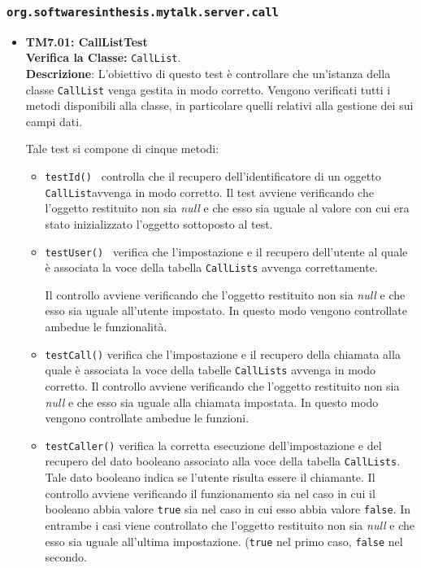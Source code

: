 \subsubsection{\texttt{org.softwaresinthesis.mytalk.server.call}}
\begin{itemize}
\item \textbf{TM7.01: CallListTest}\\
\textbf{Verifica la Classe:} \texttt{CallList}.\\
\textbf{Descrizione}: L'obiettivo di questo test è controllare che un'istanza della classe  \texttt{CallList} venga gestita in modo corretto. Vengono verificati tutti i metodi disponibili alla classe, in particolare quelli relativi alla gestione dei sui campi dati.

Tale test si compone di cinque metodi:
\begin{itemize}
\item \texttt{testId() } controlla che il recupero dell'identificatore di un oggetto \texttt{CallList}avvenga in modo corretto. 
Il test avviene verificando che l'oggetto restituito non sia \textit{null} e che esso sia uguale al valore con cui era stato inizializzato l'oggetto sottoposto al test.

\item \texttt{testUser() } verifica che l'impostazione e il recupero dell'utente al quale è associata la voce della tabella \texttt{CallLists} avvenga correttamente. 

Il controllo avviene verificando che l'oggetto restituito non sia \textit{null} e che esso sia uguale all'utente impostato. In questo modo vengono controllate ambedue le funzionalità.

\item \texttt{testCall()} verifica che l'impostazione e il recupero della chiamata alla quale è associata la voce della tabelle \texttt{CallLists} avvenga in modo corretto. Il controllo avviene verificando che l'oggetto restituito non sia \textit{null} e che esso sia uguale alla chiamata impostata. In questo modo vengono controllate ambedue le funzioni.

\item \texttt{testCaller()} verifica la corretta esecuzione  dell'impostazione e del recupero del dato booleano associato alla voce della tabella \texttt{CallLists}. Tale dato booleano indica se l'utente risulta essere il chiamante.
Il controllo avviene verificando il funzionamento sia nel caso in cui il booleano abbia valore \texttt{true} sia nel caso in cui esso abbia valore \texttt{false}.
In entrambe i casi viene controllato che l'oggetto restituito non sia \textit{null} e che esso sia uguale all'ultima impostazione. (\texttt{true} nel primo caso, \texttt{false} nel secondo.


\end{itemize}
\end{itemize}
